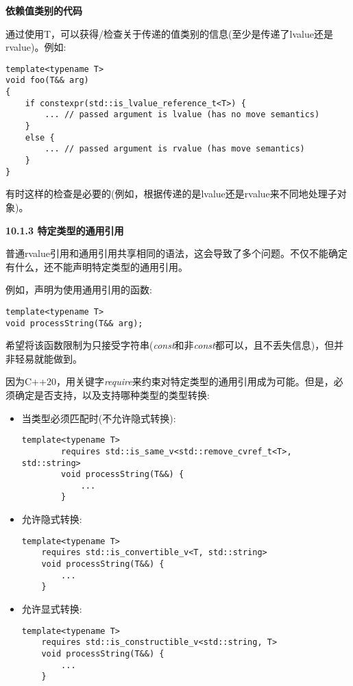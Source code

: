 \hspace*{\fill} \par %
\textbf{依赖值类别的代码}

通过使用T，可以获得/检查关于传递的值类别的信息(至少是传递了lvalue还是rvalue)。例如:\par

\begin{lstlisting}[caption={}]
template<typename T>
void foo(T&& arg)
{
	if constexpr(std::is_lvalue_reference_t<T>) {
		... // passed argument is lvalue (has no move semantics)
	}
	else {
		... // passed argument is rvalue (has move semantics)
	}
}
\end{lstlisting}

有时这样的检查是必要的(例如，根据传递的是lvalue还是rvalue来不同地处理子对象)。\par

\hspace*{\fill} \par %
\textbf{10.1.3 特定类型的通用引用}

普通rvalue引用和通用引用共享相同的语法，这会导致了多个问题。不仅不能确定有什么，还不能声明特定类型的通用引用。\par

例如，声明为使用通用引用的函数:\par

\begin{lstlisting}[caption={}]
template<typename T>
void processString(T&& arg);
\end{lstlisting}


希望将该函数限制为只接受字符串(\textit{const}和非\textit{const}都可以，且不丢失信息)，但并非轻易就能做到。\par

因为C++20，用关键字\textit{require}来约束对特定类型的通用引用成为可能。但是，必须确定是否支持，以及支持哪种类型的类型转换:\par

\begin{itemize}
	\item 当类型必须匹配时(不允许隐式转换):\par
	\begin{lstlisting}[caption={}]
		template<typename T>
		requires std::is_same_v<std::remove_cvref_t<T>, std::string>
		void processString(T&&) {
			...
		}
	\end{lstlisting}
	\item 允许隐式转换:\par
	\begin{lstlisting}[caption={}]
	template<typename T>
	requires std::is_convertible_v<T, std::string>
	void processString(T&&) {
		...
	}
	\end{lstlisting}
	\item 允许显式转换:
	\begin{lstlisting}[caption={}]
	template<typename T>
	requires std::is_constructible_v<std::string, T>
	void processString(T&&) {
		...
	}
	\end{lstlisting}
\end{itemize}

